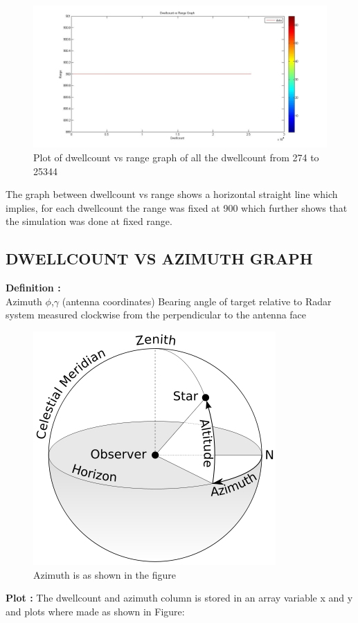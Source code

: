 \documentclass[14pt]{article} %
\begin{document}
 \begin{figure}[H]
  \centerline{\includegraphics[width=\linewidth]{dwellcount-range(1,25067).jpg}}
  \caption{Plot of dwellcount vs range graph of all the dwellcount from 274 to 25344}
  \label{fig:figure 22}
  \end{figure}
  \begin{tcolorbox}[title =\textbf{Analysis}]
  The graph between dwellcount vs range shows a horizontal straight line which implies, for each dwellcount the range was fixed at 900 which further shows that the simulation was done at fixed range.
  \end{tcolorbox}
  
  \subsection{DWELLCOUNT VS AZIMUTH GRAPH}
  \noindent \textbf{Definition : }\\
   \indent Azimuth $\phi$,$\gamma$ (antenna coordinates) Bearing angle of target relative to Radar system measured clockwise from the perpendicular to the antenna face 
   \begin{figure}[H]
  \centerline{\includegraphics[width=0.4\linewidth]{azimuth.png}}
  \caption{Azimuth is as shown in the figure}
  \label{fig:figure 23}
  \end{figure}
  \textbf{Plot : }The dwellcount and azimuth column is stored in an array variable x and y and plots where made as shown in Figure:
  
\end{document}
